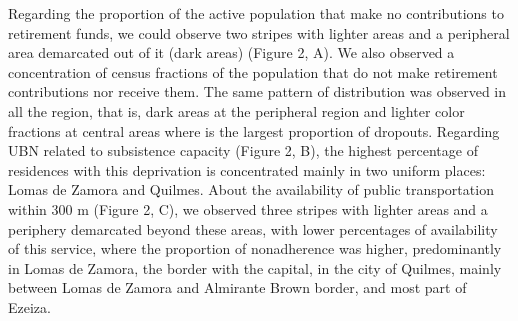 \begin{multicols}{2}
\par{}Regarding the proportion of the active population that make no contributions to retirement funds,\allowbreak{} we could observe two stripes with lighter areas and a peripheral area demarcated out of it (\allowbreak{}dark areas)\allowbreak{} (\allowbreak{}Figure 2,\allowbreak{} A)\allowbreak{}.\allowbreak{} We also observed a concentration of census fractions of the population that do not make retirement contributions nor receive them.\allowbreak{} The same pattern of distribution was observed in all the region,\allowbreak{} that is,\allowbreak{} dark areas at the peripheral region and lighter color fractions at central areas where is the largest proportion of dropouts.\allowbreak{} Regarding UBN related to subsistence capacity (\allowbreak{}Figure 2,\allowbreak{} B)\allowbreak{},\allowbreak{} the highest percentage of residences with this deprivation is concentrated mainly in two uniform places:\allowbreak{} Lomas de Zamora and Quilmes.\allowbreak{} About the availability of public transportation within 300 m (\allowbreak{}Figure 2,\allowbreak{} C)\allowbreak{},\allowbreak{} we observed three stripes with lighter areas and a periphery demarcated beyond these areas,\allowbreak{} with lower percentages of availability of this service,\allowbreak{} where the proportion of nonadherence was higher,\allowbreak{} predominantly in Lomas de Zamora,\allowbreak{} the border with the capital,\allowbreak{} in the city of Quilmes,\allowbreak{} mainly between Lomas de Zamora and Almirante Brown border,\allowbreak{} and most part of Ezeiza.\allowbreak{}\par{}
\par
{
}
\par


\end{multicols}
